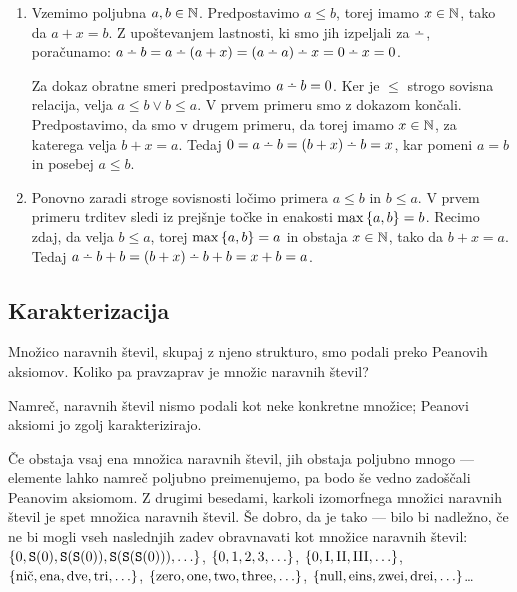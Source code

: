 \begin{dokaz}
\begin{enumerate}
\item
Vzemimo poljubna $a, b \in \mathbb{N}$. Predpostavimo $a \leq b$, torej imamo $x \in \mathbb{N}$, tako da $a + x = b$. Z upoštevanjem lastnosti, ki smo jih izpeljali za $\monus$, poračunamo: $a \monus b = a \monus (a + x) = (a \monus a) \monus x = 0 \monus x = 0$.

Za dokaz obratne smeri predpostavimo $a \monus b = 0$. Ker je $\leq$ strogo sovisna relacija, velja $a \leq b \lor b \leq a$. V prvem primeru smo z dokazom končali. Predpostavimo, da smo v drugem primeru, da torej imamo $x \in \mathbb{N}$, za katerega velja $b + x = a$. Tedaj $0 = a \monus b = (b + x) \monus b = x$, kar pomeni $a = b$ in posebej $a \leq b$.
\item
Ponovno zaradi stroge sovisnosti ločimo primera $a \leq b$ in $b \leq a$. V prvem primeru trditev sledi iz prejšnje točke in enakosti $\max\set{a, b} = b$. Recimo zdaj, da velja $b \leq a$, torej $\max\set{a, b} = a$ in obstaja $x \in \mathbb{N}$, tako da $b + x = a$. Tedaj $a \monus b + b = (b + x) \monus b + b = x + b = a$.
\end{enumerate}
\end{dokaz}

\subsection{Karakterizacija}

Množico naravnih števil, skupaj z njeno strukturo, smo podali preko Peanovih aksiomov. Koliko pa pravzaprav je množic naravnih števil?

Namreč, naravnih števil nismo podali kot neke konkretne množice; Peanovi aksiomi jo zgolj karakterizirajo. 

Če obstaja vsaj ena množica naravnih števil, jih obstaja poljubno mnogo --- elemente lahko namreč poljubno preimenujemo, pa bodo še vedno zadoščali Peanovim aksiomom. Z drugimi besedami, karkoli izomorfnega množici naravnih števil je spet množica naravnih števil. Še dobro, da je tako --- bilo bi nadležno, če ne bi mogli vseh naslednjih zadev obravnavati kot množice naravnih števil: $\set{0, \suc(0), \suc(\suc(0)), \suc(\suc(\suc(0))),\ldots}$, $\set{0, 1, 2, 3,\ldots}$, $\set{\mathrm{0}, \mathrm{I}, \mathrm{II}, \mathrm{III},\ldots}$, $\set{\text{nič}, \text{ena}, \text{dve}, \text{tri},\ldots}$, $\set{\text{zero}, \text{one}, \text{two}, \text{three},\ldots}$, $\set{\text{null}, \text{eins}, \text{zwei}, \text{drei},\ldots}$\ldots

